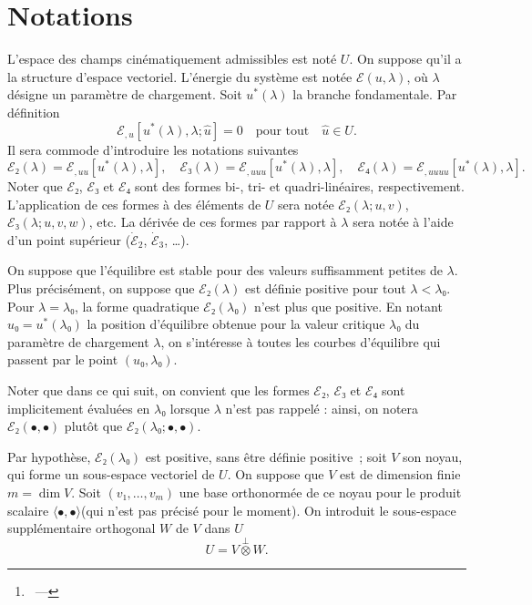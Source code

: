 \documentclass[12pt, final]{scrartcl}
\theoremstyle{definition}
\begin{document}
\title{\sbtitle}
\author{\sbauthor\thanks{\sbaddress~--- \sbemail}}
\maketitle

\begin{abstract}
 blabla
\end{abstract}


\section{Notations}

L'espace des champs cinématiquement admissibles est noté \(U\). On suppose qu'il
a la structure d'espace vectoriel. L'énergie du système est notée \(ℰ(u, λ)\),
où \(λ\) désigne un paramètre de chargement. Soit \(u^{\ast}(λ)\) la branche
fondamentale. Par définition
\begin{equation}
  ℰ_{,u}[u^{\ast}(λ), λ; \hat{u}]=0 \quad \text{pour tout} \quad \hat{u}∈U.
\end{equation}
Il sera commode d'introduire les notations suivantes
\begin{equation}
  ℰ₂(λ) = ℰ_{,uu}[u^{\ast}(λ), λ], \quad ℰ₃(λ) = ℰ_{,uuu}[u^{\ast}(λ), λ], \quad ℰ₄(λ) = ℰ_{,uuuu} [u^{\ast}(λ), λ].
\end{equation}
Noter que \(ℰ₂\), \(ℰ₃\) et \(ℰ₄\) sont des formes bi-, tri- et
quadri-linéaires, respectivement. L'application de ces formes à des éléments de
\(U\) sera notée \(ℰ₂(λ; u, v)\), \(ℰ₃(λ; u, v, w)\), etc. La dérivée de ces
formes par rapport à \(λ\) sera notée à l'aide d'un point supérieur
(\(\dot{ℰ}_2\), \(\dot{ℰ}_3\), \dots).

On suppose que l'équilibre est stable pour des valeurs suffisamment petites de
\(λ\). Plus précisément, on suppose que \(ℰ₂(λ)\) est définie positive pour tout
\(λ < λ₀\). Pour \(λ = λ₀\), la forme quadratique \(ℰ₂(λ₀)\) n'est plus que
positive. En notant \(u₀ = u^{\ast}(λ₀)\) la position d'équilibre obtenue pour
la valeur critique \(λ₀\) du paramètre de chargement \(λ\), on s'intéresse à
toutes les courbes d'équilibre qui passent par le point \((u₀, λ₀)\).

Noter que dans ce qui suit, on convient que les formes \(ℰ₂\), \(ℰ₃\) et \(ℰ₄\)
sont implicitement évaluées en \(λ₀\) lorsque \(λ\) n'est pas rappelé : ainsi,
on notera \(ℰ₂(•, •)\) plutôt que \(ℰ₂(λ₀ ; •, •)\).

Par hypothèse, \(ℰ₂(λ₀)\) est positive, sans être définie
positive~; soit \(V\) son noyau, qui forme un sous-espace vectoriel de \(U\). On
suppose que \(V\) est de dimension finie \(m = \dim V\). Soit
\((v₁, \ldots, v_m)\) une base orthonormée de ce noyau pour le produit scalaire
\(〈 •, • 〉\)(qui n'est pas précisé pour le moment). On introduit le
sous-espace supplémentaire orthogonal \(W\) de \(V\) dans \(U\)
\begin{equation}
  U = V \overset{\perp}{\otimes} W.
\end{equation}
\end{document}
